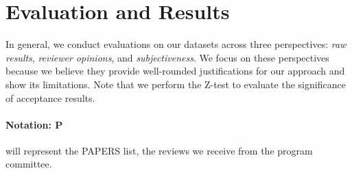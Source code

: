 \documentclass{article} %
\begin{document}
\section{Evaluation and Results}

\label{sec:results}
In general, we conduct evaluations on our datasets across three perspectives: \textit{raw results}, \textit{reviewer opinions}, and \textit{subjectiveness}. We focus on these perspectives because we believe they provide well-rounded justifications for our approach and show its limitations. Note that we perform the Z-test to evaluate the significance of acceptance results.
\paragraph{Notation:
P}will represent the PAPERS list, the reviews we receive from the program committee.
\end{document}

